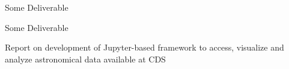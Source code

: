 \begin{workpackage}
\begin{wpdescription}
\end{wpdescription}

\begin{tasklist}
% 





\end{tasklist}



\begin{wpdelivs}
\begin{wpdeliv}[due=1,miles=startup,id=infrastructure,dissem=PU,nature=DEC,lead=SRL]
  {Some Deliverable}
\end{wpdeliv}
\begin{wpdeliv}[due=1,miles=startup,id=opendose-analysis,dissem=PU,nature=DEC,lead=INSERM]
  {Some Deliverable}
\end{wpdeliv}
\begin{wpdeliv}[due=1,miles=startup,id=application-astro,dissem=PU,nature=R,lead=CDS]
  {Report on development of Jupyter-based framework to access, visualize and analyze astronomical data available at CDS}
\end{wpdeliv}

\end{wpdelivs}
\end{workpackage}

